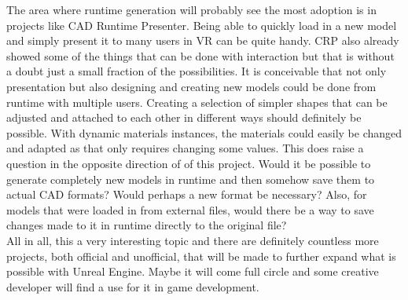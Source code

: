 The area where runtime generation will probably see the most adoption is in projects like CAD Runtime Presenter. Being able to quickly load in a new model and simply present it to many users in VR can be quite handy. \acs{CRP} also already showed some of the things that can be done with interaction but that is without a doubt just a small fraction of the possibilities. It is conceivable that not only presentation but also designing and creating new models could be done from runtime with multiple users. Creating a selection of simpler shapes that can be adjusted and attached to each other in different ways should definitely be possible. With dynamic materials instances, the materials could easily be changed and adapted as that only requires changing some values. This does raise a question in the opposite direction of of this project. Would it be possible to generate completely new models in runtime and then somehow save them to actual CAD formats? Would perhaps a new format be necessary? Also, for models that were loaded in from external files, would there be a way to save changes made to it in runtime directly to the original file?\\
All in all, this a very interesting topic and there are definitely countless more projects, both official and unofficial, that will be made to further expand what is possible with Unreal Engine. Maybe it will come full circle and some creative developer will find a use for it in game development.
